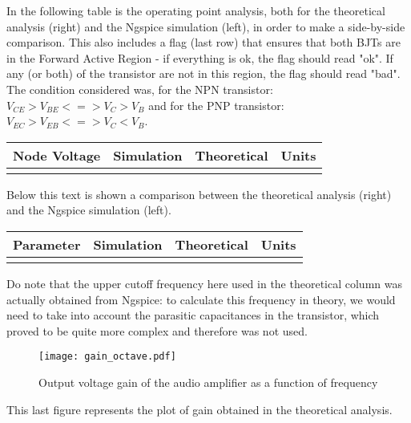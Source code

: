 In the following table is the operating point analysis, both for the theoretical analysis (right) and the Ngspice simulation (left), in order to make a side-by-side comparison. This also includes a flag (last row) that ensures that both BJTs are in the Forward Active Region - if everything is ok, the flag should read "ok". If any (or both) of the transistor are not in this region, the flag should read "bad". The condition considered was, for the NPN transistor: $V_{CE} > V_{BE} <=> V_{C} > V_{B}$ and for the PNP transistor: $V_{EC} > V_{EB} <=> V_{C} < V_{B}$.\par

\hfill
 \parbox{1\linewidth}{
  \centering
  \begin{tabular}{|l|l|l|r|}
    \hline    
    {\bf Node Voltage} & {\bf Simulation} & {\bf Theoretical } & {\bf Units }\\ \hline
    
  \label{tab:op_FAR}
  \end{tabular}
  }
\par

Below this text is shown a comparison between the theoretical analysis (right) and the Ngspice simulation (left).\par


\hfill
 \parbox{1\linewidth}{
  \centering
  \begin{tabular}{|l|l|l|r|}
    \hline    
    {\bf Parameter} & {\bf Simulation} & {\bf Theoretical } & {\bf Units }\\ \hline
    
  \label{tab:results}
  \end{tabular}
  }
  

Do note that the upper cutoff frequency here used in the theoretical column was actually obtained from Ngspice: to calculate this frequency in theory, we would need to take into account the parasitic capacitances in the transistor, which proved to be quite more complex and therefore was not used.



\begin{figure}[H] \centering
\texttt{[image: gain\_octave.pdf]}
\caption{Output voltage gain of the audio amplifier as a function of frequency}
\label{fig:gain_octa}
\end{figure}

\par This last figure represents the plot of gain obtained in the theoretical analysis.



\pagebreak
